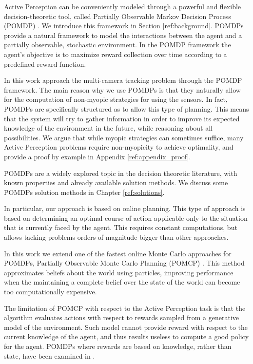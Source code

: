 Active Perception can be conveniently modeled through a powerful and flexible decision-theoretic
tool, called Partially Observable Markov Decision Process (POMDP) \cite{cit:pomdp}. We introduce
this framework in Section \ref{ref:background}. POMDPs provide a natural framework to model the
interactions between the agent and a partially observable, stochastic environment.  In the POMDP
framework the agent's objective is to maximize reward collection over time according to a predefined
reward function.

In this work approach the multi-camera tracking problem through the POMDP framework.  The main
reason why we use POMDPs is that they naturally allow for the computation of non-myopic strategies
for using the sensors. In fact, POMDPs are specifically structured as to allow this type of
planning. This means that the system will try to gather information in order to improve its expected
knowledge of the environment in the future, while reasoning about all possibilities. We argue that
while myopic strategies can sometimes suffice, many Active Perception problems require non-myopicity
to achieve optimality, and provide a proof by example in Appendix \ref{ref:appendix_proof}.

%

POMDPs are a widely explored topic in the decision theoretic literature, with known properties and
already available solution methods. We discuss some POMDPs solution methods in Chapter
\ref{ref:solutions}.

In particular, our approach is based on online planning. This type of approach is based on
determining an optimal course of action applicable only to the situation that is currently faced by
the agent. This requires constant computations, but allows tacking problems orders of magnitude
bigger than other approaches.

In this work we extend one of the fastest online Monte Carlo approaches for POMDPs, Partially
Observable Monte Carlo Planning (POMCP) \cite{cit:pomcp}. This method approximates beliefs about the
world using particles, improving performance when the maintaining a complete belief over the state
of the world can become too computationally expensive.

The limitation of POMCP with respect to the Active Perception task is that the algorithm evaluates
actions with respect to rewards sampled from a generative model of the environment. Such model
cannot provide reward with respect to the current knowledge of the agent, and thus results useless
to compute a good policy for the agent. POMDPs where rewards are based on knowledge, rather than
state, have been examined in \cite{cit:rpomdp}.

